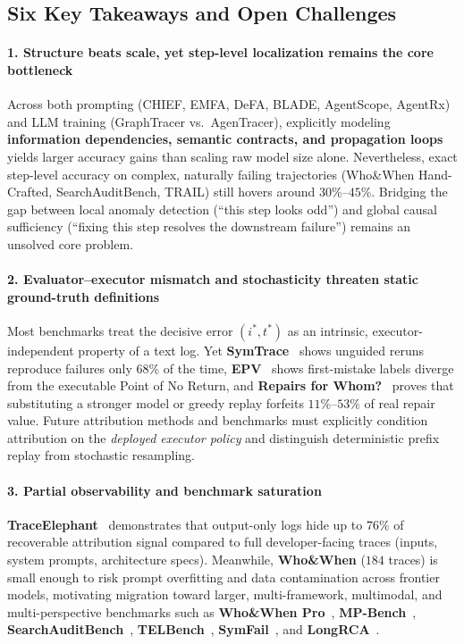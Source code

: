 \subsection{Six Key Takeaways and Open Challenges}

\paragraph{1. Structure beats scale, yet step-level localization remains the core bottleneck}
Across both prompting (CHIEF, EMFA, DeFA, BLADE, AgentScope, AgentRx) and LLM training (GraphTracer vs.\ AgenTracer), explicitly modeling \textbf{information dependencies, semantic contracts, and propagation loops} yields larger accuracy gains than scaling raw model size alone. Nevertheless, exact step-level accuracy on complex, naturally failing trajectories (Who\&When Hand-Crafted, SearchAuditBench, TRAIL) still hovers around $30\%$--$45\%$. Bridging the gap between local anomaly detection (``this step looks odd'') and global causal sufficiency (``fixing this step resolves the downstream failure'') remains an unsolved core problem.

\paragraph{2. Evaluator--executor mismatch and stochasticity threaten static ground-truth definitions}
Most benchmarks treat the decisive error $(i^*, t^*)$ as an intrinsic, executor-independent property of a text log. Yet \textbf{SymTrace}~\citep{luan2026symtrace} shows unguided reruns reproduce failures only $68\%$ of the time, \textbf{EPV}~\citep{shen2026epv} shows first-mistake labels diverge from the executable Point of No Return, and \textbf{Repairs for Whom?}~\citep{liao2026repairs} proves that substituting a stronger model or greedy replay forfeits $11\%$--$53\%$ of real repair value. Future attribution methods and benchmarks must explicitly condition attribution on the \emph{deployed executor policy} and distinguish deterministic prefix replay from stochastic resampling.

\paragraph{3. Partial observability and benchmark saturation}
\textbf{TraceElephant}~\citep{chen2026traceelephant} demonstrates that output-only logs hide up to $76\%$ of recoverable attribution signal compared to full developer-facing traces (inputs, system prompts, architecture specs). Meanwhile, \textbf{Who\&When} ($184$ traces) is small enough to risk prompt overfitting and data contamination across frontier models, motivating migration toward larger, multi-framework, multimodal, and multi-perspective benchmarks such as \textbf{Who\&When Pro}~\citep{liu2026whowhenpro}, \textbf{MP-Bench}~\citep{in2026mpbench}, \textbf{SearchAuditBench}~\citep{liang2026searchauditor}, \textbf{TELBench}~\citep{wang2026drift}, \textbf{SymFail}~\citep{luan2026symtrace}, and \textbf{LongRCA}~\citep{zhang2026longrca}.

